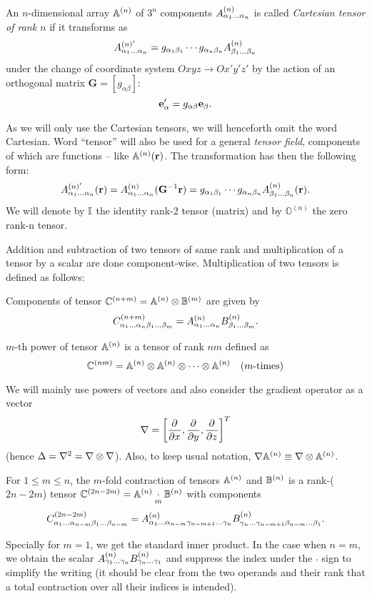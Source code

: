 \begin{definition}
  An $n$-dimensional array $\AA$ of $3^n$ components $\AAA{\alpha_1\ldots\alpha_n}$ is called \textit{Cartesian tensor 
  of rank $n$} if it transforms as
  \begin{equation}\label{eq:tenstran}
    A^{(n)'}_{\alpha_1\ldots\alpha_n} = g_{\alpha_1\beta_1}\cdots g_{\alpha_n\beta_n}\AAA{\beta_1\ldots\beta_n}
  \end{equation}
  under the change of coordinate system $Oxyz \to Ox'y'z'$ by the action of an orthogonal matrix $\mathbf{G} = [g_{\alpha\beta}]$:
  $$
    \be_\alpha' = g_{\alpha\beta}\be_\beta.
  $$
\end{definition}
As we will only use the Cartesian tensors, we will henceforth omit the word Cartesian. Word ``tensor'' will also be used
 for a general \textit{tensor field}, components of which are functions -- like $\AA(\br)$. The transformation has then 
 the following form:
$$
  A^{(n)'}_{\alpha_1\ldots\alpha_n}(\br) = \AAA{\alpha_1\ldots\alpha_n}(\mathbf{G}^{-1}\br) = g_{\alpha_1\beta_1}\cdots g_{\alpha_n\beta_n}\AAA{\beta_1\ldots\beta_n}(\br).
$$
We will denote by $\eye$ the identity rank-2 tensor (matrix) and by $ \mathbb{O}^{(n)}$ the zero rank-n tensor.

Addition and subtraction of two tensors of same rank and multiplication of a tensor by a scalar are done component-wise. 
Multiplication of two tensors is defined as follows:
\begin{definition}
  Components of tensor $\CC[n+m] = \AA\otimes\BB[m]$ are given by
  $$
    \CCC[n+m]{\alpha_1\ldots\alpha_n\beta_1\ldots\beta_m} = \AAA{\alpha_1\ldots\alpha_n}\BBB{\beta_1\ldots\beta_m}.
  $$
\end{definition}

\begin{definition}
  $m$-th power of tensor $\AA$ is a tensor of rank $nm$ defined as
  $$
    \CC[nm] = \AA\otimes\AA\otimes\cdots\otimes\AA\quad \mbox{($m$-times)}
  $$
\end{definition}
We will mainly use powers of vectors and also consider the gradient operator as a vector
$$
  \nabla = \left[\pd{}{x}, \pd{}{y}, \pd{}{z}\right]^T
$$
(hence $\Delta = \lap = \nabla\otimes\nabla$). Also, to keep usual notation, $\nabla\AA \equiv \nabla\otimes\AA$.

\begin{definition}
  For $1\leq m \leq n$, the $m$-fold contraction of tensors $\AA$ and $\BB$ is a rank-($2n-2m$) tensor 
  $\CC[2n-2m] = \AA\underset{m}{\cdot}\BB$ with components
  $$
    \CCC[2n-2m]{\alpha_{1}\ldots\alpha_{n-m}\beta_1\ldots\beta_{n-m}} = 
    \AAA{\alpha_1\ldots\alpha_{n-m}\gamma_{n-m+1}\ldots\gamma_n}\BBB{\gamma_n\ldots\gamma_{n-m+1}\beta_{n-m}\ldots\beta_1}.
  $$
\end{definition}
Specially for $m = 1$, we get the standard inner product. 
In the case when $n = m$, we obtain the scalar $\AAA{\gamma_1\ldots\gamma_n}\BBB{\gamma_n\ldots\gamma_1}$ and 
suppress the index under the $\cdot$ sign to simplify the writing (it should be clear from the two operands and their 
rank that a total contraction over all their indices is intended). 

